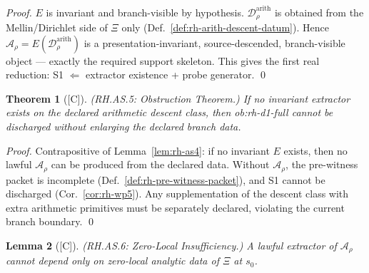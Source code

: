 \documentclass[12pt,oneside]{amsbook}
\theoremstyle{plain}
\newtheorem{theorem}{Theorem}[section]
\newtheorem{lemma}[theorem]{Lemma}
\theoremstyle{definition}
\theoremstyle{remark}
\newcommand{\status}[1]{\textup{[#1]}}
\begin{document}
\begin{proof}
$E$ is invariant and branch-visible by hypothesis.
$\mathcal{D}_\rho^{\mathrm{arith}}$ is obtained from the Mellin/Dirichlet
side of $\Xi$ only (Def.~\ref{def:rh-arith-descent-datum}).
Hence $\mathcal{A}_\rho = E(\mathcal{D}_\rho^{\mathrm{arith}})$ is
a presentation-invariant, source-descended, branch-visible object
--- exactly the required support skeleton. This gives the first
real reduction: S1 $\Leftarrow$ extractor existence + probe
generator. \qed
\end{proof}

\begin{theorem}[\status{C}]\label{thm:rh-as5}
\textup{(RH.AS.5: Obstruction Theorem.)}
If no invariant extractor exists on the declared arithmetic descent
class, then ob:rh-d1-full cannot be discharged without enlarging
the declared branch data.
\end{theorem}

\begin{proof}
Contrapositive of Lemma~\ref{lem:rh-as4}: if no invariant $E$
exists, then no lawful $\mathcal{A}_\rho$ can be produced from the
declared data. Without $\mathcal{A}_\rho$, the pre-witness packet
is incomplete (Def.~\ref{def:rh-pre-witness-packet}), and S1 cannot
be discharged (Cor.~\ref{cor:rh-wp5}). Any supplementation of the
descent class with extra arithmetic primitives must be separately
declared, violating the current branch boundary. \qed
\end{proof}

\begin{lemma}[\status{C}]\label{lem:rh-as6}
\textup{(RH.AS.6: Zero-Local Insufficiency.)}
A lawful extractor of $\mathcal{A}_\rho$ cannot depend only on
zero-local analytic data of $\Xi$ at $s_0$.
\end{lemma}
\end{document}
